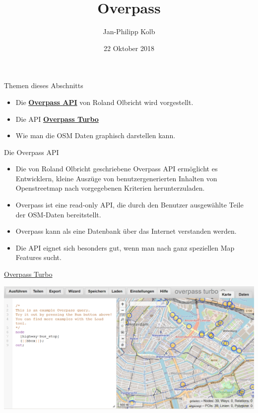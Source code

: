 \documentclass[ignorenonframetext,]{beamer}
\title{Overpass}
\author{Jan-Philipp Kolb}
\date{22 Oktober 2018}
\providecommand{\tightlist}{%
  \setlength{\itemsep}{0pt}\setlength{\parskip}{0pt}}
\begin{document}
\frame{\titlepage}

\begin{frame}{Themen dieses Abschnitts}

\begin{itemize}
\tightlist
\item
  Die
  \href{https://wiki.openstreetmap.org/wiki/Overpass_API}{\textbf{Overpass
  API}} von Roland Olbricht wird vorgestellt.
\item
  Die API \href{https://overpass-turbo.eu/}{\textbf{Overpass Turbo}}
\item
  Wie man die OSM Daten graphisch darstellen kann.
\end{itemize}

\end{frame}

\begin{frame}{Die Overpass API}

\begin{itemize}
\tightlist
\item
  Die von Roland Olbricht geschriebene Overpass API ermöglicht es
  Entwicklern, kleine Auszüge von benutzergenerierten Inhalten von
  Openstreetmap nach vorgegebenen Kriterien herunterzuladen.
\item
  Overpass ist eine read-only API, die durch den Benutzer ausgewählte
  Teile der OSM-Daten bereitstellt.
\item
  Overpass kann als eine Datenbank über das Internet verstanden werden.
\item
  Die API eignet sich besonders gut, wenn man nach ganz speziellen Map
  Features sucht.
\end{itemize}

\end{frame}

\begin{frame}{\href{https://overpass-turbo.eu/}{Overpass Turbo}}

\includegraphics{figure/overpassTurbo.PNG}

\end{frame}
\end{document}

